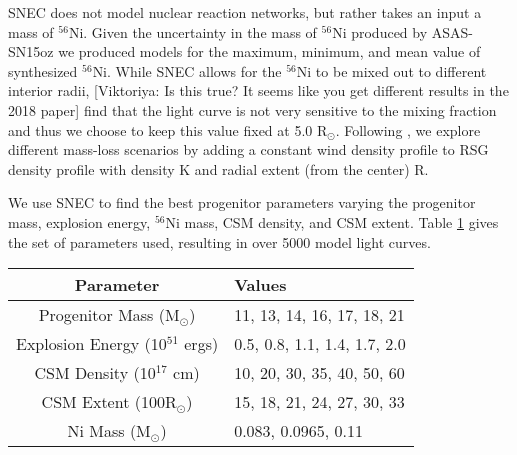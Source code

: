 \documentclass[preprint]{aastex61}   	%
\newcommand{\viktoriyacomment}[1]{{\color{blue} [{#1}]}}
\newcommand{\Viktoriya}[1]{\viktoriyacomment{Viktoriya: #1}}
\newcommand{\msunperiod}{M$_{\odot}$}
\begin{document}
SNEC does not model nuclear reaction networks, but rather takes an input a mass of ${}^{56}$Ni. 
Given the uncertainty in the mass of ${}^{56}$Ni produced by ASAS-SN15oz we produced models for the maximum, minimum, and mean value of synthesized ${}^{56}$Ni.
While SNEC allows for the ${}^{56}$Ni to be mixed out to different interior radii, \Viktoriya{Is this true? It seems like you get different results in the 2018 paper} find that the light curve is not very sensitive to the mixing fraction and thus we choose to keep this value fixed at 5.0 R$_{\odot}$. 
Following \citet{2017morozova}, we explore different mass-loss scenarios by adding a constant wind density profile to RSG density profile with density K and radial extent (from the center) R.

We use SNEC to find the best progenitor parameters varying the progenitor mass, explosion energy, ${}^{56}$Ni mass, CSM density, and CSM extent. 
Table \ref{tb:param} gives the set of parameters used, resulting in over 5000 model light curves.
\begin{table}
\centering
\label{tb:param}
\begin{tabular}{|c|l|}
\hline
Parameter & Values \\
\hline
Progenitor Mass (\msunperiod) & 11, 13, 14, 16, 17, 18, 21 \\
Explosion Energy (10$^{51}$ ergs) & 0.5, 0.8, 1.1, 1.4, 1.7, 2.0 \\
CSM Density (10$^{17}$ cm) & 10, 20, 30, 35, 40, 50, 60 \\
CSM Extent (100R$_{\odot}$) & 15, 18, 21, 24, 27, 30, 33 \\
Ni Mass (\msunperiod) & 0.083, 0.0965, 0.11 \\
\hline
\end{tabular}
\end{table}
\end{document}

